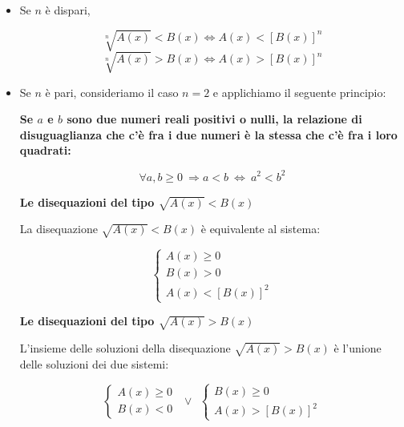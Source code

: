 \documentclass[12pt, letterpaper]{article}
\begin{document}
	\begin{itemize}
		\item Se $n$ è dispari,
		
		\[
			\sqrt[n]{A(x)} < B(x) \Leftrightarrow A(x) < [B(x)]^n
		\]
		\[
			\sqrt[n]{A(x)} > B(x) \Leftrightarrow A(x) > [B(x)]^n
		\]
		
		\item Se $n$ è pari, consideriamo il caso $n = 2$ e applichiamo il seguente principio:
		
		\textbf{Se $a$ e $b$ sono due numeri reali positivi o nulli, la relazione di disuguaglianza che c'è fra i due numeri è la stessa che c'è fra i loro quadrati: }
		
		\[
			\forall a, b \geq 0 ~ \Rightarrow a < b ~ \Leftrightarrow ~ a^2 < b^2
		\]
		
		\textbf{Le disequazioni del tipo $\sqrt{A(x)} < B(x)$}
		
		La disequazione $\sqrt{A(x)} < B(x)$ è equivalente al sistema:
		
		\[
			\begin{cases}
				A(x) \geq 0 \\
				B(x) > 0 \\
				A(x) < [B(x)]^2
			\end{cases}
		\]
		
		\textbf{Le disequazioni del tipo $\sqrt{A(x)} > B(x)$}
		
		L'insieme delle soluzioni della disequazione $\sqrt{A(x)} > B(x)$ è l'unione delle soluzioni dei due sistemi:
		
		\[
			\begin{cases}
				A(x) \geq 0 \\
				B(x) < 0 
			\end{cases} ~~ \lor ~~ \begin{cases}
				B(x) \geq 0 \\
				A(x) > [B(x)]^2
			\end{cases}
		\]
		
	\end{itemize}
	
	
\end{document}
